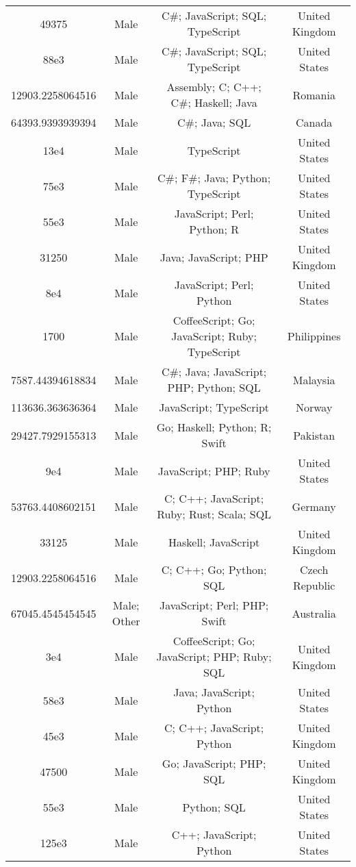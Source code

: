 \begin{center}
\begin{tabular}{ |c|c|c|c| }
49375  &  Male  &  C\#; JavaScript; SQL; TypeScript  &  United Kingdom  \\ 
88e3  &  Male  &  C\#; JavaScript; SQL; TypeScript  &  United States  \\ 
12903.2258064516  &  Male  &  Assembly; C; C++; C\#; Haskell; Java  &  Romania  \\ 
64393.9393939394  &  Male  &  C\#; Java; SQL  &  Canada  \\ 
13e4  &  Male  &  TypeScript  &  United States  \\ 
75e3  &  Male  &  C\#; F\#; Java; Python; TypeScript  &  United States  \\ 
55e3  &  Male  &  JavaScript; Perl; Python; R  &  United States  \\ 
31250  &  Male  &  Java; JavaScript; PHP  &  United Kingdom  \\ 
8e4  &  Male  &  JavaScript; Perl; Python  &  United States  \\ 
1700  &  Male  &  CoffeeScript; Go; JavaScript; Ruby; TypeScript  &  Philippines  \\ 
7587.44394618834  &  Male  &  C\#; Java; JavaScript; PHP; Python; SQL  &  Malaysia  \\ 
113636.363636364  &  Male  &  JavaScript; TypeScript  &  Norway  \\ 
29427.7929155313  &  Male  &  Go; Haskell; Python; R; Swift  &  Pakistan  \\ 
9e4  &  Male  &  JavaScript; PHP; Ruby  &  United States  \\ 
53763.4408602151  &  Male  &  C; C++; JavaScript; Ruby; Rust; Scala; SQL  &  Germany  \\ 
33125  &  Male  &  Haskell; JavaScript  &  United Kingdom  \\ 
12903.2258064516  &  Male  &  C; C++; Go; Python; SQL  &  Czech Republic  \\ 
67045.4545454545  &  Male; Other  &  JavaScript; Perl; PHP; Swift  &  Australia  \\ 
3e4  &  Male  &  CoffeeScript; Go; JavaScript; PHP; Ruby; SQL  &  United Kingdom  \\ 
58e3  &  Male  &  Java; JavaScript; Python  &  United States  \\ 
45e3  &  Male  &  C; C++; JavaScript; Python  &  United Kingdom  \\ 
47500  &  Male  &  Go; JavaScript; PHP; SQL  &  United Kingdom  \\ 
55e3  &  Male  &  Python; SQL  &  United States  \\ 
125e3  &  Male  &  C++; JavaScript; Python  &  United States  \\ 

\end{tabular}
\end{center}
